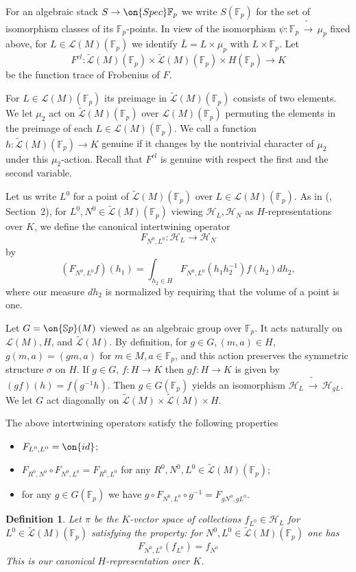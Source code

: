 \documentclass[11pt]{amsart}
\newtheorem{Def}[subsubsection]{Definition}
\theoremstyle{definition}
\theoremstyle{remark}
\newcommand{\cH}{{\mathcal H}}
\newcommand{\cL}{{\mathcal L}}
\newcommand{\Sp}{\on{\mathbb{S}p}}
\newcommand{\Spec}{\on{Spec}}
\newcommand{\id}{\on{id}}
\newcommand{\Fp}{\mathbb{F}_p}  %
\newcommand{\iso}{{\widetilde\to}}
\newcommand{\comp}{\circ}
\newcommand{\wt}{\widetilde}
\newcommand{\<}{\langle}
\renewcommand{\>}{\rangle}
\begin{document}
\sssec{} 
\label{Sect_3.1.4}
For an algebraic stack $S\to\Spec \Fp$ we write $S(\Fp)$ for the set of isomorphism classes of its $\Fp$-points. In view of the isomorphism $\psi:\Fp\,\iso\,\mu_p$ fixed above,  for $L\in\cL(M)(\Fp)$ we identify $\bar L=L\times \mu_p$ with $L\times \Fp$. Let 
$$
F^{cl}: \wt\cL(M)(\Fp)\times\wt\cL(M)(\Fp)\times H(\Fp)\to K
$$ 
be the function trace of Frobenius of $F$. 

 For $L\in\cL(M)(\Fp)$ its preimage in $\wt\cL(M)(\Fp)$ consists of two elements. We let $\mu_2$ act on $\wt\cL(M)(\Fp)$ over $\cL(M)(\Fp)$ permuting the elements in the preimage of each $L\in\cL(M)(\Fp)$. We call a function $h: \wt\cL(M)(\Fp)\to K$ genuine if it changes by the nontrivial character of $\mu_2$ under this $\mu_2$-action. Recall that $F^{cl}$ is genuine with respect the first and the second variable.
 
 Let us write $L^0$ for a point of $\wt\cL(M)(\Fp)$ over $L\in \cL(M)(\Fp)$. As in (\cite{LL}, Section~2), for $L^0, N^0\in \wt\cL(M)(\Fp)$ viewing 
$\cH_L, \cH_N$ as $H$-representations over $K$, we define the canonical intertwining operator 
$$
F_{N^0, L^0}: \cH_L\to \cH_N
$$
by
$$
(F_{N^0, L^0}f)(h_1)=\int_{h_2\in H} F_{N^0, L^0}(h_1h_2^{-1})f(h_2)dh_2,
$$
where our measure $dh_2$ is normalized by requiring that the volume of a point is one. 

 Let $G=\Sp(M)$ viewed as an algebraic group over $\Fp$. It acts naturally on $\cL(M), H$, and $\wt\cL(M)$. 
By definition, for $g\in G, (m,a)\in H$, $g(m,a)=(gm, a)$ for $m\in M, a\in\Fp$, and this action preserves the symmetric structure $\sigma$ on $H$. If $g\in G$, $f: H\to K$ then $gf: H\to K$ is given by $(gf)(h)=f(g^{-1}h)$. Then $g\in G(\Fp)$ yields an isomorphism $\cH_L\,\iso\, \cH_{gL}$. We let $G$ act diagonally on $\wt\cL(M)\times\wt\cL(M)\times H$. 
 
 The above intertwining operators satisfy the following properties

\begin{itemize}
\item $F_{L^0, L^0}=\id$;
\item $F_{R^0, N^0}\comp F_{N^0, L^0}=F_{R^0, L^0}$ for any $R^0, N^0, L^0\in \wt\cL(M)(\Fp)$;
\item for any $g\in G(\Fp)$ we have $g\comp F_{N^0, L^0}\comp g^{-1}=F_{gN^0, gL^0}$. 
\end{itemize}
 
\begin{Def} Let $\pi$ be the $K$-vector space of collections $f_{L^0}\in \cH_L$ for $L^0\in \wt\cL(M)(\Fp)$ satisfying the property: for $N^0, L^0\in \wt\cL(M)(\Fp)$ one has 
$$
F_{N^0, L^0}(f_{L^0})=f_{N^0}
$$
This is our canonical $H$-representation over $K$. 
\end{Def} 
\end{document}
